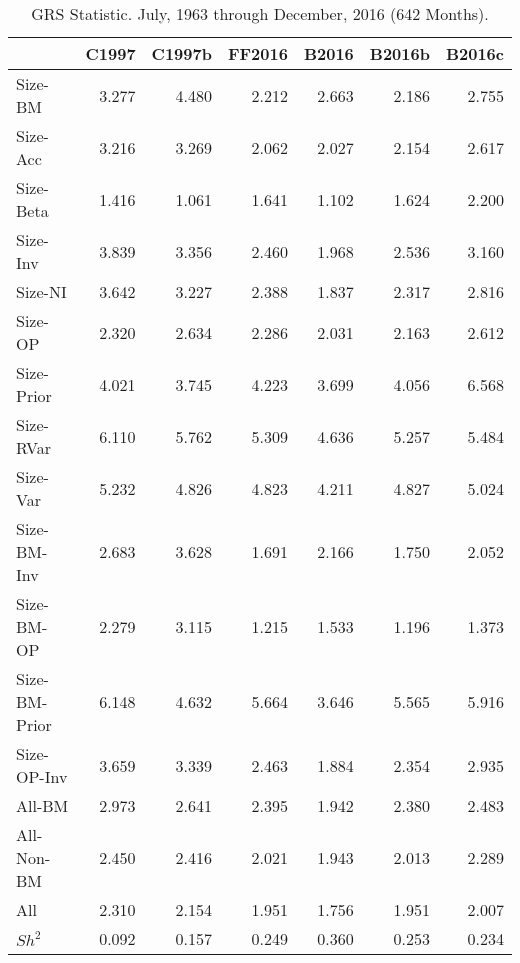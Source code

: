 
\begin{table}[!ht]
\centering
\caption{GRS Statistic. \footnotesize{July, 1963 through December, 2016 (642 Months).}}
\begin{tabular}{lrrrrrr}
  \toprule
     & C1997  & C1997b  & FF2016  & B2016  & B2016b  & B2016c  \\
  \midrule

  
    Size-BM  & 3.277  & 4.480  & 2.212  & 2.663  & 2.186  & 2.755  \\
  
    Size-Acc  & 3.216  & 3.269  & 2.062  & 2.027  & 2.154  & 2.617  \\
  
    Size-Beta  & 1.416  & 1.061  & 1.641  & 1.102  & 1.624  & 2.200  \\
  
    Size-Inv  & 3.839  & 3.356  & 2.460  & 1.968  & 2.536  & 3.160  \\
  
    Size-NI  & 3.642  & 3.227  & 2.388  & 1.837  & 2.317  & 2.816  \\
  
    Size-OP  & 2.320  & 2.634  & 2.286  & 2.031  & 2.163  & 2.612  \\
  
    Size-Prior  & 4.021  & 3.745  & 4.223  & 3.699  & 4.056  & 6.568  \\
  
    Size-RVar  & 6.110  & 5.762  & 5.309  & 4.636  & 5.257  & 5.484  \\
  
    Size-Var  & 5.232  & 4.826  & 4.823  & 4.211  & 4.827  & 5.024  \\
  
    Size-BM-Inv  & 2.683  & 3.628  & 1.691  & 2.166  & 1.750  & 2.052  \\
  
    Size-BM-OP  & 2.279  & 3.115  & 1.215  & 1.533  & 1.196  & 1.373  \\
  
    Size-BM-Prior  & 6.148  & 4.632  & 5.664  & 3.646  & 5.565  & 5.916  \\
  
    Size-OP-Inv  & 3.659  & 3.339  & 2.463  & 1.884  & 2.354  & 2.935  \\
  
    All-BM  & 2.973  & 2.641  & 2.395  & 1.942  & 2.380  & 2.483  \\
  
    All-Non-BM  & 2.450  & 2.416  & 2.021  & 1.943  & 2.013  & 2.289  \\
  
    All  & 2.310  & 2.154  & 1.951  & 1.756  & 1.951  & 2.007  \\
  
    $Sh^2$  & 0.092  & 0.157  & 0.249  & 0.360  & 0.253  & 0.234  \\
  

  \bottomrule
\end{tabular}
\label{tbl:GRS}
\end{table}